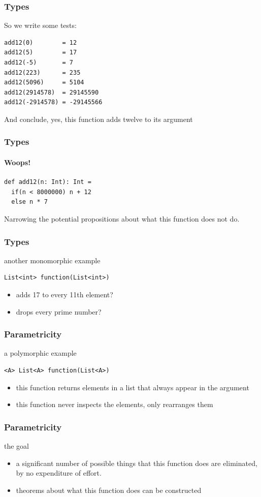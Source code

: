 \begin{frame}[fragile]
\frametitle{Types}
So we write some tests:
\begin{lstlisting}
add12(0)        = 12
add12(5)        = 17
add12(-5)       = 7
add12(223)      = 235
add12(5096)     = 5104
add12(2914578)  = 29145590
add12(-2914578) = -29145566
\end{lstlisting}
And conclude, yes, this function adds twelve to its argument
\end{frame}

\begin{frame}[fragile]
\frametitle{Types}
\framesubtitle{Woops!}
\begin{lstlisting}
def add12(n: Int): Int =
  if(n < 8000000) n + 12
  else n * 7
\end{lstlisting}
Narrowing the potential propositions about what this function does not do.
\end{frame}

\begin{frame}[fragile]
\frametitle{Types}
\begin{block}{another monomorphic example}
\begin{lstlisting}
List<int> function(List<int>)
\end{lstlisting}
\end{block}
\begin{itemize}
  \item<1> adds 17 to every 11th element?
  \item<2> drops every prime number?
\end{itemize}
\end{frame}

\begin{frame}[fragile]
\frametitle{Parametricity}
\begin{block}{a polymorphic example}
\begin{lstlisting}
<A> List<A> function(List<A>)
\end{lstlisting}
\end{block}
\begin{itemize}
  \item<1> this function returns elements in a list that always appear in the argument
  \item<2> this function never inspects the elements, only rearranges them
\end{itemize}
\end{frame}

\begin{frame}[fragile]
\frametitle{Parametricity}
\begin{block}{the goal}
\begin{itemize}
  \item<1> a significant number of possible things that this function does are eliminated, by no expenditure of effort.
  \item<2> theorems about what this function does can be constructed
\end{itemize}
\end{block}
\end{frame}

